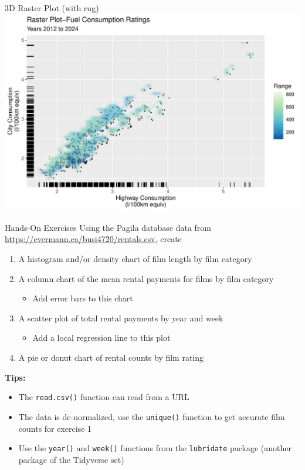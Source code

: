\documentclass[ignorenonframetext,xcolor=x11names]{beamer}
\begin{document}
\begin{frame}{3D Raster Plot (with rug)}
  \includegraphics[width=\textwidth]{fuel.raster.rug.pdf}
\end{frame}

\begin{frame}{Hands-On Exercises}
\footnotesize
Using the Pagila database data from \url{https://evermann.ca/busi4720/rentals.csv}, create
\begin{enumerate}
   \item A histogram and/or density chart of film length by film category
   \item A column chart of the mean rental payments for films by film category
   \begin{itemize}
	  \footnotesize
      \item Add error bars to this chart
   \end{itemize}
   \item A scatter plot of total rental payments by year and week
   \begin{itemize}
	  \footnotesize
      \item Add a local regression line to this plot
   \end{itemize}
   \item A pie or donut chart of rental counts by film rating
\end{enumerate}
\textbf{Tips:}
\begin{itemize}
\item The \texttt{read.csv()} function can read from a URL
\item The data is de-normalized, use the \texttt{unique()} function to get accurate film counts for exercise 1
\item Use the \texttt{year()} and \texttt{week()} functions from the \texttt{lubridate} package (another package of the Tidyverse set)
\end{itemize}
\end{frame}
\end{document}
